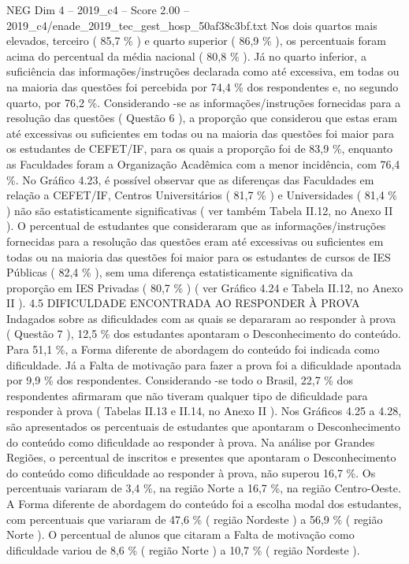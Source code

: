 \begin{textsample}{NEG Dim 4 – 2019\_c4 – Score 2.00 – 2019\_c4/enade\_2019\_tec\_gest\_hosp\_50af38c3bf.txt}
Nos dois quartos mais elevados, terceiro ( 85,7 \% ) e quarto superior ( 86,9 \% ), os percentuais foram acima do percentual da média nacional ( 80,8 \% ).
Já no quarto inferior, a suficiência das informações/instruções declarada como até excessiva, em todas ou na maioria das questões foi percebida por 74,4 \% dos respondentes e, no segundo quarto, por 76,2 \%.
Considerando -se as informações/instruções fornecidas para a resolução das questões ( Questão 6 ), a proporção que considerou que estas eram até excessivas ou suficientes em todas ou na maioria das questões foi maior para os estudantes de CEFET/IF, para os quais a proporção foi de 83,9 \%, enquanto as Faculdades foram a Organização Acadêmica com a menor incidência, com 76,4 \%.
No Gráfico 4.23, é possível observar que as diferenças das Faculdades em relação a CEFET/IF, Centros Universitários ( 81,7 \% ) e Universidades ( 81,4 \% ) não são estatisticamente significativas ( ver também Tabela II.12, no Anexo II ).
O percentual de estudantes que consideraram que as informações/instruções fornecidas para a resolução das questões eram até excessivas ou suficientes em todas ou na maioria das questões foi maior para os estudantes de cursos de IES Públicas ( 82,4 \% ), sem uma diferença estatisticamente significativa da proporção em IES Privadas ( 80,7 \% ) ( ver Gráfico 4.24 e Tabela II.12, no Anexo II ). 4.5 DIFICULDADE ENCONTRADA AO RESPONDER À PROVA Indagados sobre as dificuldades com as quais se depararam ao responder à prova ( Questão 7 ), 12,5 \% dos estudantes apontaram o Desconhecimento do conteúdo.
Para 51,1 \%, a Forma diferente de abordagem do conteúdo foi indicada como dificuldade.
Já a Falta de motivação para fazer a prova foi a dificuldade apontada por 9,9 \% dos respondentes.
Considerando -se todo o Brasil, 22,7 \% dos respondentes afirmaram que não tiveram qualquer tipo de dificuldade para responder à prova ( Tabelas II.13 e II.14, no Anexo II ).
Nos Gráficos 4.25 a 4.28, são apresentados os percentuais de estudantes que apontaram o Desconhecimento do conteúdo como dificuldade ao responder à prova.
Na análise por Grandes Regiões, o percentual de inscritos e presentes que apontaram o Desconhecimento do conteúdo como dificuldade ao responder à prova, não superou 16,7 \%.
Os percentuais variaram de 3,4 \%, na região Norte a 16,7 \%, na região Centro-Oeste.
A Forma diferente de abordagem do conteúdo foi a escolha modal dos estudantes, com percentuais que variaram de 47,6 \% ( região Nordeste ) a 56,9 \% ( região Norte ).
O percentual de alunos que citaram a Falta de motivação como dificuldade variou de 8,6 \% ( região Norte ) a 10,7 \% ( região Nordeste ).

\end{textsample}
